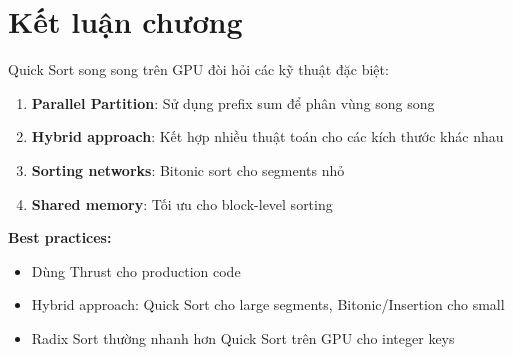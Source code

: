 \section{Kết luận chương}

Quick Sort song song trên GPU đòi hỏi các kỹ thuật đặc biệt:

\begin{enumerate}
    \item \textbf{Parallel Partition}: Sử dụng prefix sum để phân vùng song song
    \item \textbf{Hybrid approach}: Kết hợp nhiều thuật toán cho các kích thước khác nhau
    \item \textbf{Sorting networks}: Bitonic sort cho segments nhỏ
    \item \textbf{Shared memory}: Tối ưu cho block-level sorting
\end{enumerate}

\textbf{Best practices:}
\begin{itemize}
    \item Dùng Thrust  cho production code
    \item Hybrid approach: Quick Sort cho large segments, Bitonic/Insertion cho small
    \item Radix Sort thường nhanh hơn Quick Sort trên GPU cho integer keys
\end{itemize}
